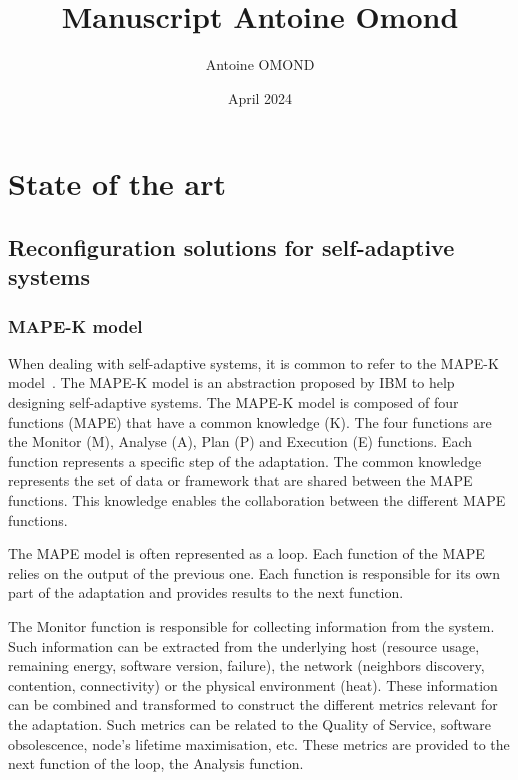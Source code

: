 \documentclass{article}
\title{Manuscript Antoine Omond}
\author{Antoine OMOND}
\date{April 2024}
\begin{document}
\maketitle

\section{State of the art}
\subsection{Reconfiguration solutions for self-adaptive systems}

\subsubsection{MAPE-K model}

When dealing with self-adaptive systems, it is common to refer to the MAPE-K model~\cite{kephart_vision_2003}. The MAPE-K model is an abstraction proposed by IBM to help designing self-adaptive systems. The MAPE-K model is composed of four functions (MAPE) that have a common knowledge (K). The four functions are the Monitor (M), Analyse (A), Plan (P) and Execution (E) functions. Each function represents a specific step of the adaptation. The common knowledge represents the set of data or framework that are shared between the MAPE functions. This knowledge enables the collaboration between the different MAPE functions.
 
The MAPE model is often represented as a loop. Each function of the MAPE relies on the output of the previous one. Each function is responsible for its own part of the adaptation and provides results to the next function. 

The Monitor function is responsible for collecting information from the system. Such information can be extracted from the underlying host (\eg resource usage, remaining energy, software version, failure), the network (\eg neighbors discovery, contention, connectivity) or the physical environment (\eg heat). These information can be combined and transformed to construct the different metrics relevant for the adaptation. Such metrics can be related to the Quality of Service, software obsolescence, node's lifetime maximisation, etc. These metrics are provided to the next function of the loop, the Analysis function.

\end{document}
